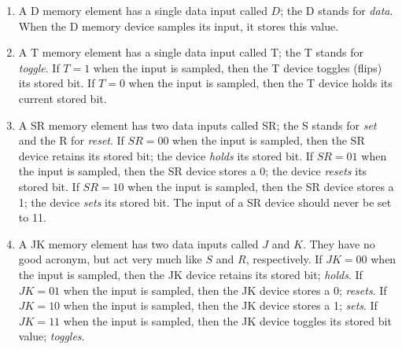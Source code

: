 \begin{enumerate}
\begin{enumerate}
\item 
{}
A D memory element has a single data input called $D$;
the D stands for {\it data}.  When the
D memory device samples its input, it stores this value.  

\item 
{}
A T memory element has a single data input called T;
the T stands for {\it toggle}.  If $T=1$ when the input
is sampled, then the T device toggles (flips) its stored bit.
If $T=0$ when the input is sampled, then the T device holds its 
current stored bit.

\item 
{}
A SR memory element has two data inputs called SR;
the S stands for {\it set} and the R for {\it reset}.
If $SR=00$ when the input is sampled, then the SR device retains
its stored bit; the device {\it holds} its stored bit.
If $SR=01$ when the input is sampled, then the SR device stores a 0;
the device {\it resets} its stored bit.
If $SR=10$ when the input is sampled, then the SR device stores a 1;
the device {\it sets} its stored bit.
The input of a SR device should never be set to 11.

\item 
{}
A JK memory element has two data inputs called $J$ and $K$. They have
no good acronym, but act very much like $S$ and $R$, respectively.
If $JK=00$ when the input is sampled, then the JK device retains
its stored bit; {\it holds}.
If $JK=01$ when the input is sampled, then the JK device stores a 0; {\it resets}.
If $JK=10$ when the input is sampled, then the JK device stores a 1; {\it sets}.
If $JK=11$ when the input is sampled, then the JK device toggles its
stored bit value; {\it toggles}.
\end{enumerate}
\end{enumerate}

